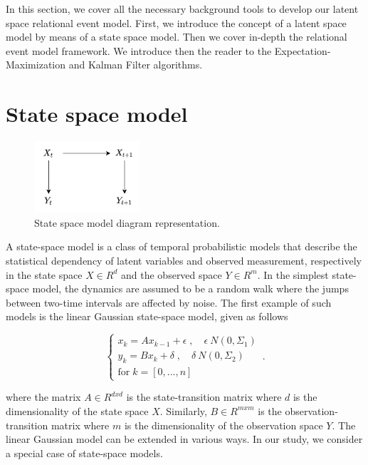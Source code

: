 \documentclass[mscthesis]{usiinfthesis}
\begin{document}
In this section, we cover all the necessary background tools to develop our latent space relational event model. First, we introduce the concept of a latent space model by means of a state space model. Then we cover in-depth the relational event model framework. We introduce then the reader to the Expectation-Maximization and Kalman Filter algorithms. 

\section{State space model}
\label{sec:latent_space}

\begin{figure}[H]
    \centering
    \includegraphics[width=0.35\textwidth]{statespace_diagram.png}
    \caption{State space model diagram representation.}
    \label{fig:pdf_invasion}
\end{figure}

A state-space model is a class of temporal probabilistic models that describe the statistical dependency of latent variables and observed measurement, respectively in the state space $X \in R^d$ and the observed space $Y \in R^m$. In the simplest state-space model, the dynamics are assumed to be a random walk where the jumps between two-time intervals are affected by noise. The first example of such models is the linear Gaussian state-space model, given as follows

\begin{eqfloat}
\begin{equation}
    \begin{cases}
      x_k = A x_{k-1} + \epsilon \; , \quad \epsilon ~ N(0, \Sigma_1) \\
      y_k = B x_k + \delta  \; , \quad \delta ~ N(0, \Sigma_2)  \\
      \textrm{for} \; k = [0, ..., n]
    \end{cases}\,.
\label{eq:statespace}
\end{equation}
\caption{State space model}
\end{eqfloat}

where the matrix $A \in R^{dxd}$ is the state-transition matrix where $d$ is the dimensionality of the state space $X$. Similarly, $B \in R^{mxm}$ is the observation-transition matrix where $m$ is the dimensionality of the observation space $Y$. The linear Gaussian model can be extended in various ways. In our study, we consider a special case of state-space models.
\end{document}
